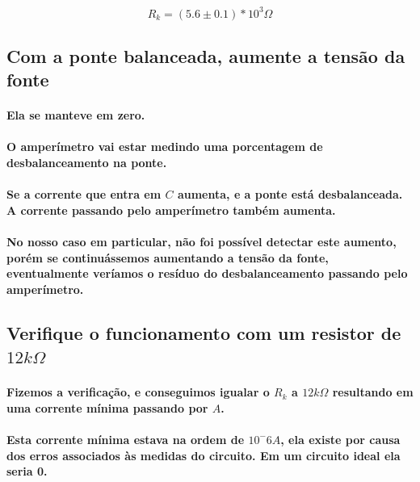 \documentclass[12pt,twoside, a4paper, twocolumn]{article}
\begin{document}
\begin{equation}
    R_k = (5.6 \pm 0.1) * 10^3 \varOmega
\end{equation}

\subsection{Com a ponte balanceada, aumente a tensão da fonte}

\paragraph*{Ela se manteve em zero.}

\paragraph*{O amperímetro vai estar medindo uma porcentagem de desbalanceamento na ponte. }

\paragraph*{Se a corrente que entra em $C$ aumenta, e a ponte está desbalanceada. A corrente passando pelo amperímetro também aumenta.}

\paragraph*{No nosso caso em particular, não foi possível detectar este aumento, porém se continuássemos aumentando a tensão da fonte, eventualmente veríamos o resíduo do desbalanceamento passando pelo amperímetro.}

\subsection{Verifique o funcionamento com um resistor de $12k \varOmega$}

\paragraph*{Fizemos a verificação, e conseguimos igualar o $R_k$ a $12k \varOmega$ resultando em uma corrente mínima passando por $A$. }

\paragraph*{Esta corrente mínima estava na ordem de $10^-6 A$, ela existe por causa dos erros associados às medidas do circuito. Em um circuito ideal ela seria 0.}
\end{document}
